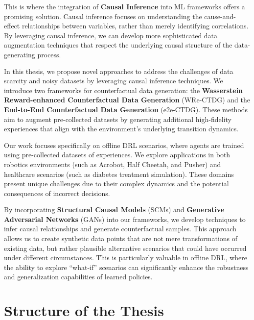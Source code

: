 This is where the integration of \textbf{Causal Inference} into
ML frameworks offers a
promising solution. Causal inference focuses on understanding the
cause-and-effect relationships between variables, rather
than merely identifying correlations. By leveraging causal inference,
we can develop more sophisticated data augmentation techniques that
respect the underlying causal structure of the data-generating process.

In this thesis, we propose novel approaches to address the
challenges of data scarcity and noisy datasets by leveraging
causal inference techniques. We introduce two frameworks for
counterfactual data generation:
the \textbf{Wasserstein Reward-enhanced Counterfactual Data Generation}
(WRe-CTDG) and the \textbf{End-to-End Counterfactual Data Generation} (e2e-CTDG).
These methods aim to augment pre-collected datasets by generating additional
high-fidelity experiences that align with the environment's underlying
transition dynamics.

Our work focuses specifically on offline DRL scenarios, where agents
are trained using pre-collected datasets of experiences.
We explore applications in both robotics environments
(such as Acrobot, Half Cheetah, and Pusher) and healthcare scenarios
(such as diabetes treatment simulation).
These domains present unique challenges due to their complex
dynamics and the potential consequences of incorrect decisions.

By incorporating \textbf{Structural Causal Models} (SCMs) and
\textbf{Generative Adversarial Networks} (GANs) into our frameworks,
we develop techniques to infer causal relationships and generate counterfactual
samples. This approach allows us to create synthetic data points
that are not mere transformations of existing data, but rather plausible
alternative scenarios that could have occurred under different circumstances.
This is particularly valuable in offline DRL, where the ability to explore
``what-if'' scenarios can significantly enhance the robustness
and generalization capabilities of learned policies.

\section{Structure of the Thesis}

